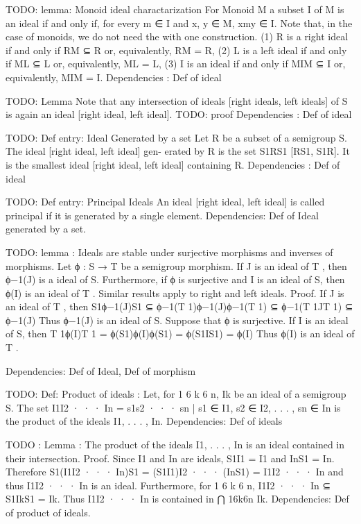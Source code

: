 TODO: lemma: Monoid ideal charactarization
For Monoid M a subset I of M is an ideal if and only if, for every m ∈ I and
x, y ∈ M, xmy ∈ I. Note that, in the case of monoids, we do not need the with one construction.
(1) R is a right ideal if and only if RM ⊆ R or, equivalently, RM = R,
(2) L is a left ideal if and only if ML ⊆ L or, equivalently, ML = L,
(3) I is an ideal if and only if MIM ⊆ I or, equivalently, MIM = I.
Dependencies : Def of ideal

TODO: Lemma
Note that any intersection of ideals [right ideals, left ideals] of S is again an
ideal [right ideal, left ideal].
TODO: proof
Dependencies : Def of ideal

TODO: Def entry: Ideal Generated by a set
Let R be a subset of a semigroup S. The ideal [right ideal, left ideal] gen-
erated by R is the set S1RS1 [RS1, S1R]. It is the smallest ideal [right ideal,
left ideal] containing R. 
Dependencies : Def of ideal

TODO: Def entry: Principal Ideals
An ideal [right ideal, left ideal] is called principal if
it is generated by a single element. 
Dependencies: Def of Ideal generated by a set.

TODO: lemma : Ideals are stable under surjective morphisms and inverses of morphisms. 
Let ϕ : S → T be a semigroup morphism. If J is an ideal
of T , then ϕ−1(J) is a ideal of S. Furthermore, if ϕ is surjective and I is an
ideal of S, then ϕ(I) is an ideal of T . Similar results apply to right and left
ideals.
Proof. If J is an ideal of T , then
S1ϕ−1(J)S1 ⊆ ϕ−1(T 1)ϕ−1(J)ϕ−1(T 1) ⊆ ϕ−1(T 1JT 1) ⊆ ϕ−1(J)
Thus ϕ−1(J) is an ideal of S.
Suppose that ϕ is surjective. If I is an ideal of S, then
T 1ϕ(I)T 1 = ϕ(S1)ϕ(I)ϕ(S1) = ϕ(S1IS1) = ϕ(I)
Thus ϕ(I) is an ideal of T .

Dependencies: Def of Ideal, Def of morphism

TODO: Def: Product of ideals : 
Let, for 1 6 k 6 n, Ik be an ideal of a semigroup S. The set
I1I2 · · · In = {s1s2 · · · sn | s1 ∈ I1, s2 ∈ I2, . . . , sn ∈ In}
is the product of the ideals I1, . . . , In.
Dependencies: Def of ideals

TODO : Lemma : The product of the ideals I1, . . . , In is an ideal contained in
their intersection.
Proof. Since I1 and In are ideals, S1I1 = I1 and InS1 = In. Therefore
S1(I1I2 · · · In)S1 = (S1I1)I2 · · · (InS1) = I1I2 · · · In
and thus I1I2 · · · In is an ideal. Furthermore, for 1 6 k 6 n, I1I2 · · · In ⊆
S1IkS1 = Ik. Thus I1I2 · · · In is contained in ⋂
16k6n Ik.
Dependencies: Def of product of ideals. 

